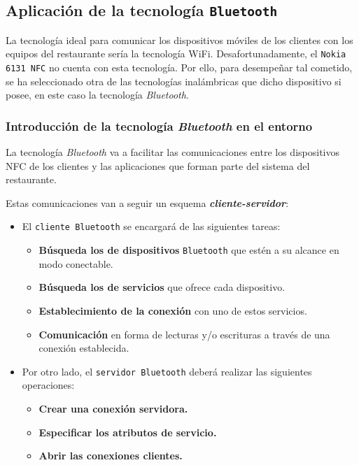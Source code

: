 \subsection{Aplicación de la tecnología \texttt{Bluetooth}}
La tecnología ideal para comunicar los dispositivos móviles de los clientes con
los equipos del restaurante sería la tecnología \acs{WiFi}. Desafortunadamente,
el \texttt{Nokia 6131 \acs{NFC}} no cuenta con esta tecnología. Por ello, para
desempeñar tal cometido, se ha seleccionado otra de las tecnologías
inalámbricas que dicho dispositivo si posee, en este caso la tecnología
\emph{Bluetooth}.

  \subsubsection{Introducción de la tecnología \emph{Bluetooth} en el entorno}
La tecnología \emph{Bluetooth} va a facilitar las comunicaciones entre los
dispositivos \acs{NFC} de los clientes y las aplicaciones que forman parte del 
sistema del restaurante.

Estas comunicaciones van a seguir un esquema \emph{\textbf{cliente-servidor}}:
\begin{itemize}
\item El \texttt{cliente \texttt{Bluetooth}} se encargará de las siguientes 
tareas:
  \begin{itemize}
  \item \textbf{Búsqueda los de dispositivos} \texttt{Bluetooth} que estén a su
alcance en modo conectable.
  \item \textbf{Búsqueda los de servicios} que ofrece cada dispositivo.
  \item \textbf{Establecimiento de la conexión} con uno de estos servicios.
  \item \textbf{Comunicación} en forma de lecturas y/o escrituras a través
de una conexión establecida.
  \end{itemize}
\item Por otro lado, el \texttt{servidor \texttt{Bluetooth}} deberá realizar
las siguientes operaciones:
  \begin{itemize}
  \item \textbf{Crear una conexión servidora.}
  \item \textbf{Especificar los atributos de servicio.}
  \item \textbf{Abrir las conexiones clientes.}
  \end{itemize}
\end{itemize}

